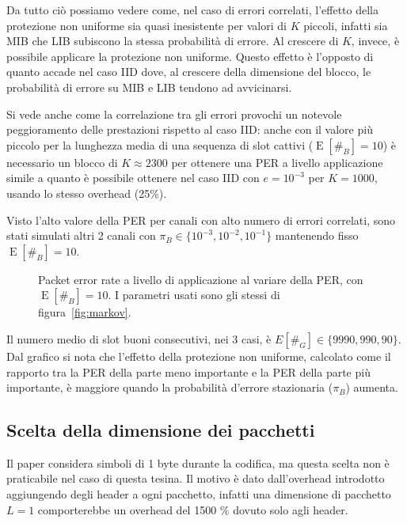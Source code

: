 \documentclass[italian, a4paper, 12pt]{article}
\newcommand{\E}[1]{\operatorname{E}\left[#1\right]}
\newcommand{\EnB}{\E{\#_B}}
\begin{document}
Da tutto ciò possiamo vedere come, nel caso di errori correlati,
l'effetto della protezione non uniforme sia quasi inesistente per
valori di $K$ piccoli, infatti sia MIB che LIB subiscono la stessa
probabilità di errore. Al crescere di $K$, invece, è possibile
applicare la protezione non uniforme.
%
Questo effetto è l'opposto di quanto accade nel caso IID \cite{uep}
dove, al crescere della dimensione del blocco, le probabilità di
errore su MIB e LIB tendono ad avvicinarsi.

Si vede anche come la correlazione tra gli errori provochi un notevole
peggioramento delle prestazioni rispetto al caso IID: anche con il
valore più piccolo per la lunghezza media di una sequenza di slot
cattivi ($\EnB = 10$) è necessario un blocco di $K\approx 2300$ per
ottenere una PER a livello applicazione simile a quanto è possibile
ottenere nel caso IID con $e=10^{-3}$ per $K=1000$, usando lo stesso
overhead (25\%).

Visto l'alto valore della PER per canali con alto numero di errori correlati,
sono stati simulati altri 2 canali con $\pi_B \in\{10^{-3}, 10^{-2}, 10^{-1}\}$
mantenendo fisso $\EnB=10$.\\
\begin{figure}[H]
    \centering
    \caption{Packet error rate a livello di applicazione al variare
    della PER, con $\EnB = 10$. I parametri
    usati sono gli stessi di figura~\ref{fig:markov}.}
  \label{fig:enbfixed}
\end{figure}
Il numero medio di slot buoni consecutivi, nei 3 casi, è $E[\#_G]\in\{9990,990,90\}$.\\
Dal grafico si nota che l'effetto della protezione non uniforme, calcolato come il rapporto
tra la PER della parte meno importante e la PER della parte più importante, è maggiore
quando la probabilità d'errore stazionaria ($\pi_B$) aumenta.

\subsection{Scelta della dimensione dei pacchetti}
\label{sec:pktsize}
Il paper \cite{uep} considera simboli di 1 byte durante la codifica,
ma questa scelta non è praticabile nel caso di questa tesina. Il
motivo è dato dall'overhead introdotto aggiungendo degli header a ogni
pacchetto, infatti una dimensione di pacchetto $L=1$ comporterebbe un
overhead del 1500 \% dovuto solo agli header.
\end{document}
